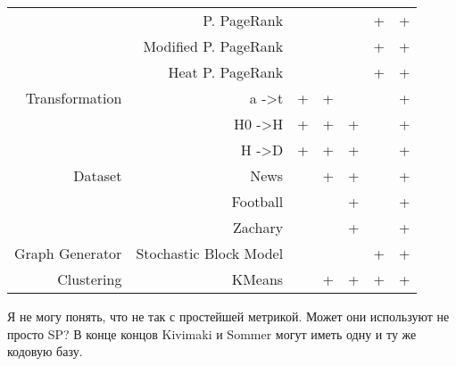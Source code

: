 \documentclass{article}
\begin{document}
\begin{table}[H]
\begin{tabular}{rr|cccc|c}
                & P. PageRank          &            &          &        & +           & +      \\
                & Modified P. PageRank &            &          &        & +           & +      \\
                & Heat P. PageRank     &            &          &        & +           & +      \\
                \cline{2-7}
Transformation  & a -\textgreater t              & +          & +        &        &             & +      \\
                & H0 -\textgreater H             & +          & +        & +      &             & +      \\
                & H -\textgreater D              & +          & +        & +      &             & +      \\
                \cline{2-7}
Dataset         & News                           &            & +        & +      &             & +      \\
                & Football                       &            &          & +      &             & +      \\
                & Zachary                        &            &          & +      &             & +      \\
                \cline{2-7}
Graph Generator & Stochastic Block Model &            &          &        & +           & + \\
                \cline{2-7}
Clustering & KMeans & & + & + & + & +
\end{tabular}
\end{table}

Я не могу понять, что не так с простейшей метрикой. Может они используют не просто SP? В конце концов Kivimaki и Sommer могут иметь одну и ту же кодовую базу. 
\end{document}
